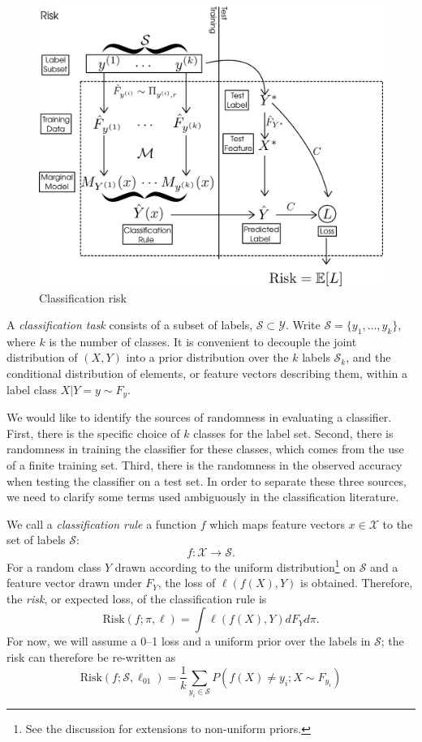 \documentclass[12pt]{article}
\begin{document}
\begin{figure}[h]
\centering
\includegraphics[scale = 0.4]{extrapolation_figures/risk.png}
\caption{Classification risk}\label{fig:risk}
\end{figure}

A \emph{classification task} consists of a subset of labels,
$\mathcal{S} \subset \mathcal{Y}$. Write $\mathcal{S}=\{y_1,\hdots,
y_k\}$, where $k$ is the number of classes.  It is convenient to
decouple the joint distribution of $(X,Y)$ into a prior distribution
over the $k$ labels $\mathcal{S}_k$, and the conditional distribution
of elements, or feature vectors describing them, within a label class
$X|Y=y \sim F_y$.

We would like to identify the sources of randomness in evaluating a
classifier.  First, there is the specific choice of $k$ classes for
the label set. Second, there is randomness in training the classifier
for these classes, which comes from the use of a finite training
set. Third, there is the randomness in the observed accuracy when
testing the classifier on a test set. In order to separate these three
sources, we need to clarify some terms used ambiguously in the
classification literature.

We call a \emph{classification rule} a function $f$ which maps feature
vectors $x \in \mathcal{X}$ to the set of labels $\mathcal{S}$:
\[
f: \mathcal{X} \to \mathcal{S}.
\]
For a random class $Y$ drawn according to the uniform
distribution\footnote{See the discussion for extensions to non-uniform
priors.} on $\mathcal{S}$ and a feature vector drawn under $F_Y$, the
loss of $\ell(f(X),Y)$ is obtained.  Therefore, the \emph{risk}, or
expected loss, of the classification rule is
\[\text{Risk}(f;\pi,\ell) = \int \ell(f(X),Y)dF_Y d\pi .\]
For now, we will assume a 0--1 loss and a uniform prior over the
labels in $\mathcal{S}$; the risk can therefore be re-written as
\[\text{Risk}(f;\mathcal{S},\ell_{01}) = \frac{1}{k}\sum_{y_i\in \mathcal{S}}P(f(X)\neq y_i ; X\sim F_{y_i} )   \]
\end{document}
